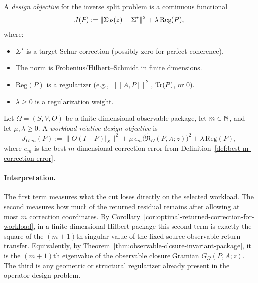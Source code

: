 \begin{definition}
\label{def:design-objective}
A \emph{design objective} for the inverse split problem is a continuous functional
\[
J(P) := \|\Sigma_{P}(z) - \Sigma^\star\|^2 + \lambda \, \mathrm{Reg}(P),
\]
where:
\begin{itemize}[itemsep=0.2em]
\item $\Sigma^\star$ is a target Schur correction (possibly zero for perfect coherence).
\item The norm is Frobenius/Hilbert--Schmidt in finite dimensions.
\item $\mathrm{Reg}(P)$ is a regularizer (e.g., $\|[A, P]\|^2$, $\mathrm{Tr}(P)$, or $0$).
\item $\lambda \ge 0$ is a regularization weight.
\end{itemize}
\end{definition}

\begin{definition}
\label{def:workload-design-objective}
Let \(\Omega=(S,V,O)\) be a finite-dimensional observable package, let
\(m\in\mathbb{N}\), and let \(\mu,\lambda\ge 0\). A \emph{workload-relative design
objective} is
\[
J_{\Omega,m}(P)
:=
\|O(I-P)\big|_{S}\|^2
+
\mu\, e_m\!\bigl(\widetilde{\mathfrak R}_{\Omega}(P,A;z)\bigr)^2
+
\lambda\,\mathrm{Reg}(P),
\]
where \(e_m\) is the best \(m\)-dimensional correction error from
Definition~\ref{def:best-m-correction-error}.
\end{definition}

\paragraph{Interpretation.}
The first term measures what the cut loses directly on the selected workload.
The second measures how much of the returned residual remains after allowing at
most \(m\) correction coordinates. By
Corollary~\ref{cor:optimal-returned-correction-for-workload}, in a
finite-dimensional Hilbert package this second term is exactly the square of
the \((m+1)\)th singular value of the fixed-source observable return transfer.
Equivalently, by Theorem~\ref{thm:observable-closure-invariant-package}, it is
the \((m+1)\)th eigenvalue of the observable closure Gramian
\(G_{\Omega}(P,A;z)\). The third is any geometric or structural regularizer
already present in the operator-design problem.

